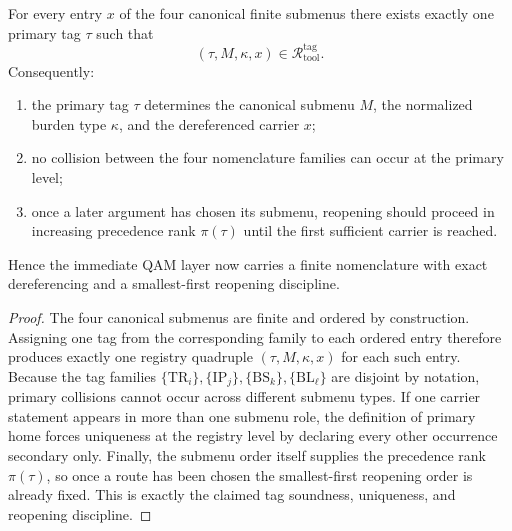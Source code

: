\begin{proposition}
\label{prop:tag-soundness-uniqueness-minimal-reopening-discipline}
For every entry \(x\) of the four canonical finite submenus there exists exactly one primary tag \(\tau\) such that
\[
(\tau,M,\kappa,x)\in \mathcal R^{\mathrm{tag}}_{\mathrm{tool}}.
\]
Consequently:
\begin{enumerate}[leftmargin=2em]
 \item the primary tag \(\tau\) determines the canonical submenu \(M\), the normalized burden type \(\kappa\), and the dereferenced carrier \(x\);
 \item no collision between the four nomenclature families can occur at the primary level;
 \item once a later argument has chosen its submenu, reopening should proceed in increasing precedence rank \(\pi(\tau)\) until the first sufficient carrier is reached.
\end{enumerate}
Hence the immediate QAM layer now carries a finite nomenclature with exact dereferencing and a smallest-first reopening discipline.
\end{proposition}

\begin{proof}
The four canonical submenus are finite and ordered by construction. Assigning one tag from the corresponding family to each ordered entry therefore produces exactly one registry quadruple \((\tau,M,\kappa,x)\) for each such entry. Because the tag families \(\{\mathrm{TR}_i\}, \{\mathrm{IP}_j\}, \{\mathrm{BS}_k\}, \{\mathrm{BL}_\ell\}\) are disjoint by notation, primary collisions cannot occur across different submenu types. If one carrier statement appears in more than one submenu role, the definition of primary home forces uniqueness at the registry level by declaring every other occurrence secondary only. Finally, the submenu order itself supplies the precedence rank \(\pi(\tau)\), so once a route has been chosen the smallest-first reopening order is already fixed. This is exactly the claimed tag soundness, uniqueness, and reopening discipline.
\end{proof}

